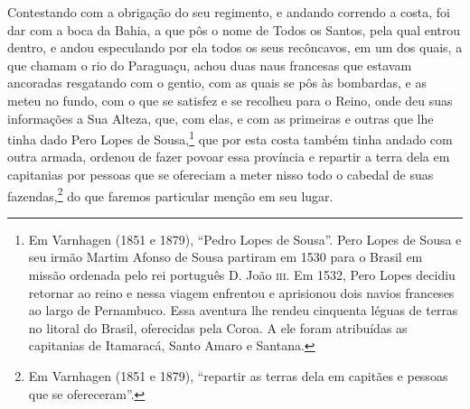 Contestando com a obrigação do seu regimento, e andando correndo a costa, foi dar com a
boca da Bahia, a que pôs o nome de Todos os Santos, pela qual entrou dentro, e andou
especulando por ela todos os seus recôncavos, em um dos quais, a que chamam o rio do
Paraguaçu, achou duas naus francesas que estavam ancoradas resgatando com o gentio, com as
quais se pôs às bombardas, e as meteu no fundo, com o que se satisfez e se recolheu para o
Reino, onde deu suas informações a Sua Alteza, que, com elas, e com as primeiras e outras
que lhe tinha dado Pero Lopes de Sousa,\footnote{ Em Varnhagen (1851 e 1879), ``Pedro
Lopes de Sousa''. Pero Lopes de Sousa e seu irmão Martim Afonso de Sousa partiram em 1530
para o Brasil em missão ordenada pelo rei português D. João \textsc{iii}. Em 1532, Pero
Lopes decidiu retornar ao reino e nessa viagem enfrentou e aprisionou dois navios
franceses ao largo de Pernambuco. Essa aventura lhe rendeu cinquenta léguas de terras no
litoral do Brasil, oferecidas pela Coroa. A ele foram atribuídas as capitanias de
Itamaracá, Santo Amaro e Santana.} que por esta costa também tinha andado com outra
armada, ordenou de fazer povoar essa província e repartir a terra dela em capitanias por
pessoas que se ofereciam a meter nisso todo o cabedal de suas fazendas,\footnote{ Em
Varnhagen (1851 e 1879), ``repartir as terras dela em capitães e pessoas que se
ofereceram''.} do que faremos particular menção em seu lugar.

